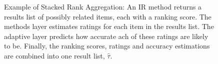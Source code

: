 \begin{figure}[t]
  \vspace{1em}
  \caption[Example of Stacked Rank Aggregation]{
    Example of Stacked Rank Aggregation: 
    An IR method returns a results list of possibly related items, each with a ranking score.
    The methods layer estimates ratings for each item in the results list.
    The adaptive layer predicts how accurate ach of these ratings are likely to be.
    Finally, the ranking scores, ratings and accuracy estimations are combined
    into one result list, $\hat{\tau}$.
  }
  \label{fig:adaptiverank}
\end{figure}

